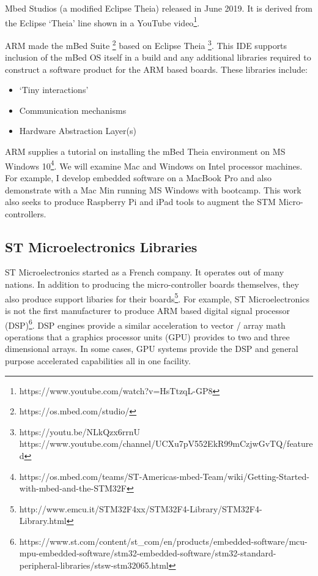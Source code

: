 \documentclass{article}
\begin{document}
Mbed Studios (a modified Eclipse Theia) released in June 2019.  It is derived from the Eclipse `Theia' line shown in a YouTube video\footnote{https://www.youtube.com/watch?v=HsTtzqL-GP8}.

ARM made the mBed Suite \footnote{https://os.mbed.com/studio/} based on Eclipse Theia  \footnote{https://youtu.be/NLkQzx6rrnU \\https://www.youtube.com/channel/UCXu7pV552EkR99mCzjwGvTQ/featured}.  This IDE supports inclusion of the mBed OS itself in a build and any additional libraries required to construct a software product for the ARM based boards.  These libraries include:
\begin{itemize}
	\item `Tiny interactions'
	\item Communication mechanisms
	\item Hardware Abstraction Layer(s)
\end{itemize}



ARM supplies a tutorial on installing the mBed Theia environment on MS Windows 10\footnote{https://os.mbed.com/teams/ST-Americas-mbed-Team/wiki/Getting-Started-with-mbed-and-the-STM32F}.  We will examine Mac and Windows on Intel processor machines.   For example, I develop embedded software on a MacBook Pro and also demonstrate with a Mac Min running MS Windows with bootcamp.  This work also seeks to produce Raspberry Pi and iPad tools to augment the STM Micro-controllers.  %


\subsection{ST Microelectronics Libraries} %
\label{sub:st_microelectronics_libraries}

ST Microelectronics started as a French company.  It operates out of many nations.  In addition to producing the micro-controller boards themselves, they also produce support libaries for their boards\footnote{http://www.emcu.it/STM32F4xx/STM32F4-Library/STM32F4-Library.html}.  For example, ST Microelectronics is not the first manufacturer to produce ARM based digital signal processor (DSP)\footnote{https://www.st.com/content/st\_com/en/products/embedded-software/mcu-mpu-embedded-software/stm32-embedded-software/stm32-standard-peripheral-libraries/stsw-stm32065.html}.  DSP engines provide a similar acceleration to vector / array math operations that a graphics processor units (GPU) provides to two and three dimensional arrays.   In some cases, GPU systems provide the DSP and general purpose accelerated capabilities all in one facility. 
\end{document}
